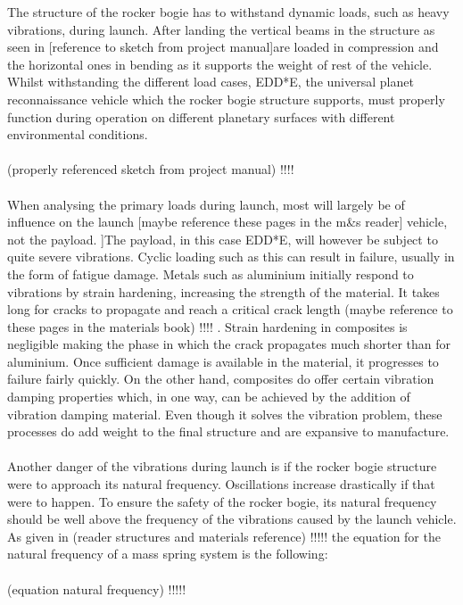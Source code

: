 The structure of the rocker bogie has to withstand dynamic loads, such as heavy vibrations, during launch. After landing the vertical beams in the structure as seen in [reference to sketch from project manual]are loaded in compression and the horizontal ones in bending as it supports the weight of rest of the vehicle. Whilst withstanding the different load cases, EDD*E, the universal planet reconnaissance vehicle which the rocker bogie structure supports, must properly function during operation on different planetary surfaces with different environmental conditions.
\\
\\
(properly referenced sketch from project manual)     !!!!
\\
\\
When analysing the primary loads during launch, most will largely be of influence on the launch [maybe reference these pages in the m&s reader] vehicle, not the payload. ]The payload, in this case EDD*E, will however be subject to quite severe vibrations. Cyclic loading such as this can result in failure, usually in the form of fatigue damage. Metals such as aluminium initially respond to vibrations by strain hardening, increasing the strength of the material. It takes long for cracks to propagate and reach a critical crack length (maybe reference to these pages in the materials book)      !!!!     . Strain hardening in composites is negligible making the phase in which the crack propagates much shorter than for aluminium. Once sufficient damage is available in the material, it progresses to failure fairly quickly. On the other hand, composites do offer certain vibration damping properties which, in one way, can be achieved by the addition of vibration damping material. Even though it solves the vibration problem, these processes do add weight to the final structure and are expansive to manufacture. 
\\
\\
Another danger of the vibrations during launch is if the rocker bogie structure were to approach its natural frequency. Oscillations increase drastically if that were to happen. To ensure the safety of the rocker bogie, its natural frequency should be well above the frequency of the vibrations caused by the launch vehicle. As given in (reader structures and materials reference)      !!!!!      the equation for the natural frequency of a mass spring system is the following:
\\
\\
(equation natural frequency)     !!!!!
